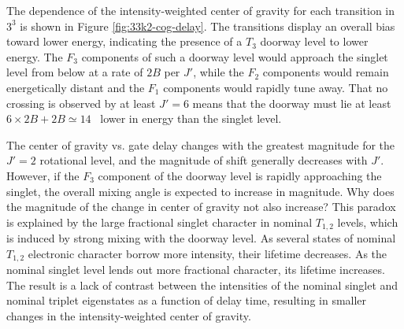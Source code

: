 The dependence of the intensity-weighted center of gravity for each
transition in $3^3$  is shown in Figure
\ref{fig:33k2-cog-delay}.  The transitions display an overall bias
toward lower energy, indicating the presence of a $T_3$ doorway level
to lower energy.  The $F_3$ components of such a doorway level would
approach the singlet level from below at a rate of $2B$ per $J'$,
while the $F_2$ components would remain energetically distant and the
$F_1$ components would rapidly tune away.  That no crossing is
observed by at least $J'=6$ means that the doorway must lie at least
$6\times2B + 2B \simeq 14$ \rcm\ lower in energy than the singlet
level.

The center of gravity vs. gate delay changes with the greatest
magnitude for the $J'=2$ rotational level, and the magnitude of shift
generally decreases with $J'$.  However, if the $F_3$ component of the
doorway level is rapidly approaching the singlet, the overall mixing
angle is expected to increase in magnitude.  Why does the magnitude of
the change in center of gravity not also increase?  This paradox is
explained by the large fractional singlet character in nominal
$T_{1,2}$ levels, which is induced by strong mixing with the doorway
level.  As several states of nominal $T_{1,2}$ electronic character
borrow more intensity, their lifetime decreases.  As the nominal
singlet level lends out more fractional character, its lifetime
increases.  The result is a lack of contrast between the intensities
of the nominal singlet and nominal triplet eigenstates as a function
of delay time, resulting in smaller changes in the intensity-weighted
center of gravity.




